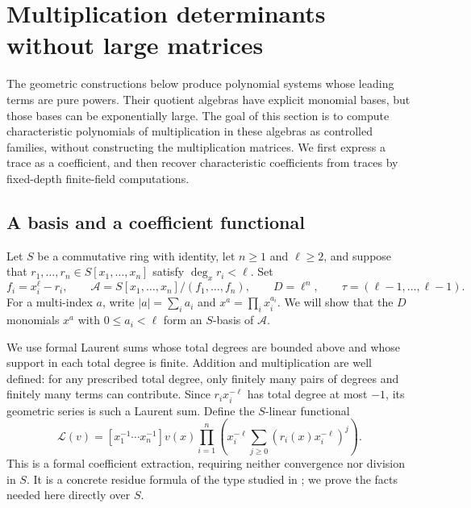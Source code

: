 \section{Multiplication determinants without large matrices}
\label{sec:algebra}

The geometric constructions below produce polynomial systems whose
leading terms are pure powers.  Their quotient algebras have explicit
monomial bases, but those bases can be exponentially large.  The goal
of this section is to compute characteristic polynomials of
multiplication in these algebras as controlled families, without
constructing the multiplication matrices.  We first express a trace
as a coefficient, and then recover characteristic coefficients from
traces by fixed-depth finite-field computations.

\subsection{A basis and a coefficient functional}

Let $S$ be a commutative ring with identity, let $n\ge1$ and $\ell\ge2$,
and suppose that $r_1,\ldots,r_n\in S[x_1,\ldots,x_n]$ satisfy
$\deg_x r_i<\ell$.  Set
\begin{equation}\label{eq:quotient-algebra}
 f_i=x_i^\ell-r_i,\qquad
 \mathcal A=S[x_1,\ldots,x_n]/(f_1,\ldots,f_n),\qquad
 D=\ell^n,\qquad \tau=(\ell-1,\ldots,\ell-1).
\end{equation}
For a multi-index $a$, write $|a|=\sum_i a_i$ and
$x^a=\prod_i x_i^{a_i}$.  We will show that the $D$ monomials
$x^a$ with $0\le a_i<\ell$ form an $S$-basis of $\mathcal A$.

We use formal Laurent sums whose total degrees are bounded above and
whose support in each total degree is finite.  Addition and
multiplication are well defined: for any prescribed total degree,
only finitely many pairs of degrees and finitely many terms can
contribute.  Since $r_i x_i^{-\ell}$ has total degree at most $-1$,
its geometric series is such a Laurent sum.  Define the $S$-linear
functional
\begin{equation}\label{eq:laurent-functional}
 \mathcal L(v)=
 [x_1^{-1}\cdots x_n^{-1}]
 v(x)\prod_{i=1}^n
 \left(x_i^{-\ell}\sum_{j\ge0}
       (r_i(x)x_i^{-\ell})^j\right).
\end{equation}
This is a formal coefficient extraction, requiring neither convergence
nor division in $S$.  It is a concrete residue formula of the type
studied in \cite{CattaniDickensteinSturmfels1996}; we prove the facts
needed here directly over $S$.

